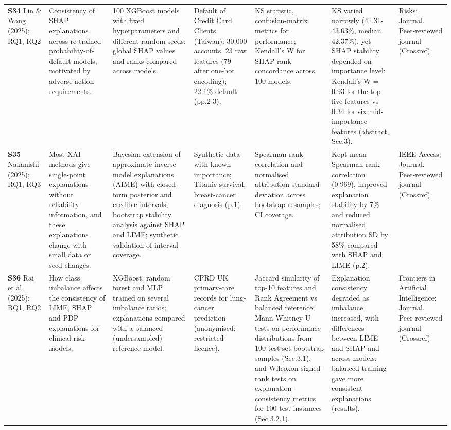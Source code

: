 \begin{longtable}{@{}P{1.55cm}P{2.9cm}P{4.5cm}P{3.2cm}P{3.4cm}P{4.6cm}P{3.6cm}@{}}
\textbf{S34} \cite{S34} Lin \& Wang (2025); RQ1, RQ2 & Consistency of SHAP explanations across re-trained probability-of-default models, motivated by adverse-action requirements. & 100 XGBoost models with fixed hyperparameters and different random seeds; global SHAP values and ranks compared across models. & Default of Credit Card Clients (Taiwan): 30,000 accounts, 23 raw features (79 after one-hot encoding); 22.1\% default (pp.2-3). & KS statistic, confusion-matrix metrics for performance; Kendall's W for SHAP-rank concordance across 100 models. & KS varied narrowly (41.31-43.63\%, median 42.37\%), yet SHAP stability depended on importance level: Kendall's W = 0.93 for the top five features vs 0.34 for six mid-importance features (abstract, Sec.3). & Risks; Journal. Peer-reviewed journal (Crossref) \\
\textbf{S35} \cite{S35} Nakanishi (2025); RQ1, RQ3 & Most XAI methods give single-point explanations without reliability information, and these explanations change with small data or seed changes. & Bayesian extension of approximate inverse model explanations (AIME) with closed-form posterior and credible intervals; bootstrap stability analysis against SHAP and LIME; synthetic validation of interval coverage. & Synthetic data with known importance; Titanic survival; breast-cancer diagnosis (p.1). & Spearman rank correlation and normalised attribution standard deviation across bootstrap resamples; CI coverage. & Kept mean Spearman rank correlation (0.969), improved explanation stability by 7\% and reduced normalised attribution SD by 58\% compared with SHAP and LIME (p.2). & IEEE Access; Journal. Peer-reviewed journal (Crossref) \\
\textbf{S36} \cite{S36} Rai et al. (2025); RQ1, RQ2 & How class imbalance affects the consistency of LIME, SHAP and PDP explanations for clinical risk models. & XGBoost, random forest and MLP trained on several imbalance ratios; explanations compared with a balanced (undersampled) reference model. & CPRD UK primary-care records for lung-cancer prediction (anonymised; restricted licence). & Jaccard similarity of top-10 features and Rank Agreement vs balanced reference; Mann-Whitney U tests on performance distributions from 100 test-set bootstrap samples (Sec.3.1), and Wilcoxon signed-rank tests on explanation-consistency metrics for 100 test instances (Sec.3.2.1). & Explanation consistency degraded as imbalance increased, with differences between LIME and SHAP and across models; balanced training gave more consistent explanations (results). & Frontiers in Artificial Intelligence; Journal. Peer-reviewed journal (Crossref) \\

\end{longtable}
